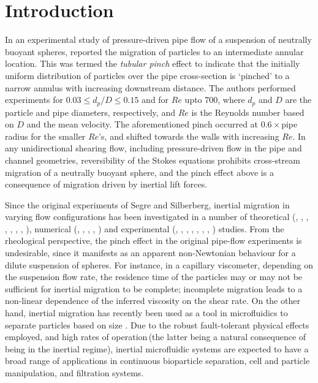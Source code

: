 \documentclass{jfm}
\begin{document}
\section{Introduction} \label{sec:intro}
In an experimental study of pressure-driven pipe flow of a suspension of neutrally buoyant spheres, \cite{segresilberberg1962a,segresilberberg1962b} reported the migration of particles to an intermediate annular location. This was termed the \textit{tubular pinch} effect to indicate that the initially uniform distribution of particles over the pipe cross-section is `pinched' to a narrow annulus with increasing downstream distance. The authors performed experiments for $0.03\leq d_p/D\leq0.15$ and for $Re$ upto 700, where $d_p$ and $D$ are the particle and pipe diameters, respectively, and $Re$ is the Reynolds number based on $D$ and the mean velocity. The aforementioned pinch occurred at $0.6\times$pipe radius for the smaller $Re$'s, and shifted towards the walls with increasing $Re$. In any unidirectional shearing flow, including pressure-driven flow in the pipe and channel geometries, reversibility of the Stokes equations prohibits cross-stream migration of a neutrally buoyant sphere, and the pinch effect above is a consequence of migration driven by inertial lift forces.

Since the original experiments of Segre and Silberberg, inertial migration in varying flow configurations has been investigated in a number of theoretical (\cite{saffman1965}, \cite{coxbrenner1968}, \cite{holeal1974}, \cite{vasseur1976},  \cite{cox1977}, \cite{schonberghinch1989}, \cite{asmolov1999}, \cite{matas2009}), numerical (\cite{ladd2006}, \cite{shao2008inertial}, \cite{seki2017}, \cite{nakayama2019}, \cite{glowinski2021}) and experimental (\cite{repetti1964}, \cite{jeffrey1965}, \cite{karnis1966}, \cite{tachibana1973}, \cite{aoki1979}, \cite{matas2004}, \cite{masaeli2012}, \cite{nakayama2019}) studies. From the rheological perspective, the pinch effect in the original pipe-flow experiments is undesirable, since it manifests as an apparent non-Newtonian behaviour for a dilute suspension of spheres. For instance, in a capillary viscometer, depending on the suspension flow rate, the residence time of the particles may or may not be sufficient for inertial migration to be complete; incomplete migration leads to a non-linear dependence of the inferred viscosity on the shear rate\citep{segre1963}. On the other hand, inertial migration has recently been used as a tool in microfluidics to separate particles based on size \citep{dicarlo2007}. Due to the robust fault-tolerant physical effects employed, and high rates of operation\,(the latter being a natural consequence of being in the inertial regime), inertial microfluidic systems are expected to have a broad range of applications in continuous bioparticle separation, cell and particle manipulation, and filtration systems\citep{dicarlo2009}.
\end{document}
